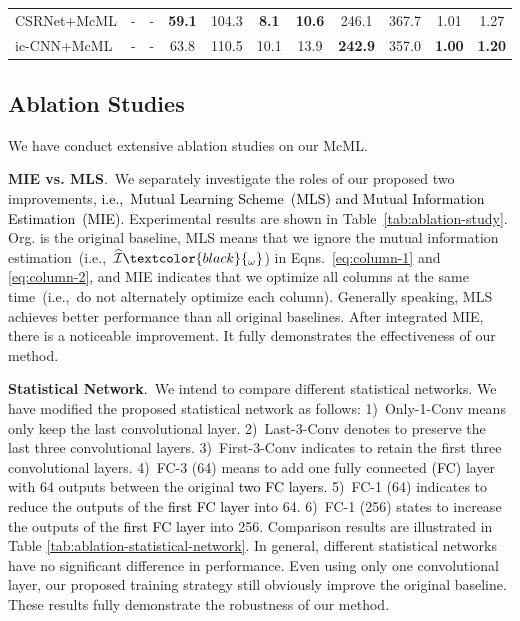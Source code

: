 \documentclass[sigconf]{acmart}
\newcommand{\ljx}[1]{\textcolor{black}{#1}}
\newcommand{\II}{\mathcal{I}}
\newcommand\Eqs{Eqns.}
\begin{document}
\begin{table}[t]
\begin{center}
\begin{tabular}{|lll|cc|cc|cc|cc|}
\multicolumn{1}{|l|}{CSRNet+McML}   & \multicolumn{1}{c}{-} & \multicolumn{1}{c|}{-} & \textbf{59.1}  & 104.3 & \textbf{8.1}  & \textbf{10.6} & 246.1 & 367.7 & 1.01 & 1.27          \\
\multicolumn{1}{|l|}{ic-CNN+McML}    & \multicolumn{1}{c}{-} & \multicolumn{1}{c|}{-}  & 63.8  & 110.5 & 10.1 & 13.9 & \textbf{242.9} & 357.0   & \textbf{1.00}    & \textbf{1.20}   \\ \hline
\end{tabular}
\end{center}
\vspace{-2mm}
\label{tab:stoa-1}
\end{table}


\vspace{-2mm}
\subsection{Ablation Studies}
\label{sec:ablation-studies}
We have conduct extensive ablation studies on our McML.

\noindent\textbf{MIE vs. MLS}.~We separately investigate the roles of our proposed two improvements,
\ljx{i.e.,~Mutual Learning Scheme~(MLS) and Mutual Information Estimation~(MIE).}
Experimental results are shown in Table~\ref{tab:ablation-study}.
Org. is the original baseline, MLS means that we ignore the mutual information estimation~(i.e.,~$\widehat{\II}\ljx{_\omega}$) in \Eqs~\ref{eq:column-1} and \ref{eq:column-2}, and MIE indicates that we optimize all columns at the same time~(i.e.,~do not alternately optimize each column). 
Generally speaking, MLS achieves better performance than all original baselines. 
After integrated MIE, there is a noticeable improvement.
It fully demonstrates the effectiveness of our method.



\noindent\textbf{Statistical Network}.~We intend to compare different statistical networks.
We have modified the proposed statistical network as follows:
1)~Only-1-Conv means only keep the last convolutional layer.
2)~Last-3-Conv denotes to preserve the last three convolutional layers.
3)~First-3-Conv indicates to retain the first three convolutional layers.
4)~FC-3 (64) means to add one fully connected \ljx{(FC)} layer with 64 outputs between the original \ljx{two FC layers. }%
5)~FC-1 (64) indicates to reduce the outputs of the \ljx{first FC layer} into 64. 
6)~FC-1 (256) states to increase the outputs of the \ljx{first FC layer} into 256.
Comparison results are illustrated in Table \ref{tab:ablation-statistical-network}.
In general, different statistical networks have no significant difference in performance. 
Even using only one convolutional layer, our proposed training strategy still obviously improve the original baseline.
These results fully demonstrate the robustness of our method.
\end{document}
